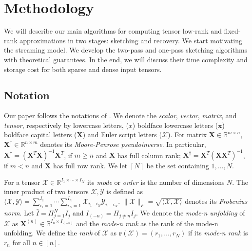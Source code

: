 \section{Methodology} 

We will describe our main algorithms for computing tensor low-rank and fixed-rank approximations in two stages: sketching and recovery. We start motivating the streaming model. We develop the two-pass and one-pass sketching algorithms with theoretical guarantees. In the end, we will discuss their time complexity and storage cost for both sparse and dense input tensors. 

\subsection{Notation}
Our paper follows the notations of \cite{kolda2009tensor}. We denote the \textit{scalar}, \textit{vector}, \textit{matrix}, and \textit{tensor}, respectively by lowercase letters, ($x$) boldface lowercase letters ($\mathbf{x}$)  boldface capital letters  ($\mathbf{X}$)  and Euler script letters ($\mathscr{X}$). For matrix $\mathbf{X} \in \mathbb{R}^{m \times n}$, $\mathbf{X}^\dag \in \mathbb{R}^{n \times m}$ denotes its \textit{Moore-Penrose pseudoinverse}. In particular, $\mathbf{X}^\dag = (\mathbf{X}^T \mathbf{X})^{-1}\mathbf{X}^T$, if $m \geq n$ and $\mathbf{X}$ has full column rank; $\mathbf{X}^\dag = \mathbf{X}^T(\mathbf{XX}^T)^{-1}$, if $m < n$ and $\mathbf{X}$ has full row rank. We let $[N]$ be the set containing $1,\dots, N$. 

For a tensor $\mathscr{X} \in \mathbb{R}^{I_1 \times \cdots \times I_N}$ its \textit{mode} or \textit{order} is the number of dimensions $N$. The inner product of two tensors $\mathscr{X}, \mathscr{Y}$ is defined as $\langle \mathscr{X}, \mathscr{Y}\rangle = \sum_{i_1=1}^{I_1}\cdots \sum_{i_N=1}^{I_n} \mathscr{X}_{i_1\dots i_N}\mathscr{Y}_{i_1\dots i_N}$. $\|\mathscr{X}\|_F = \sqrt{\langle \mathscr{X}, \mathscr{X}\rangle}$ denotes its \textit{Frobenius norm}. Let $\bar{I} = \Pi_{j = 1}^N I_j $ and $I_{(-n)} = \Pi_{j \neq n} I_j $. We denote the \textit{mode-n unfolding} of $\mathscr{X}$ as $\mathbf{X}^{(n)} \in \mathbb{R}^{I_n \times I_{(-n)}}$ and the \textit{mode-n rank} as the rank of the mode-n unfolding. We define the \textit{rank} of  $\mathscr{X}$ as $\mathbf{r}(\mathscr{X}) = (r_1,\dots, r_N)$ if its \textit{mode-n rank} is $r_n$ for all $n\in [n]$. \par 

